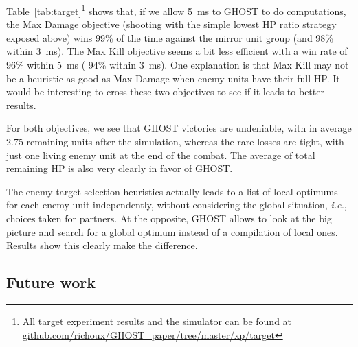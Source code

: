 \documentclass[journal]{IEEEtran}
\newcommand{\minormod}[1]{\color{red} #1\color{black} \xspace}
\newcommand{\ghost}{\textsc{GHOST}\xspace}
\newcommand{\ie}{\textit{i.e.}}
\begin{document}

Table~\ref{tab:target}\footnote{All target experiment results and the simulator can be found at
\href{https://github.com/richoux/GHOST\_paper/tree/master/xp/target}{github.com/richoux/GHOST\_paper/tree/master/xp/target}}
shows that, if we allow 5~ms to \ghost to do computations, the Max Damage objective \minormod{(shooting with the simple lowest HP ratio strategy exposed above)} wins \minormod{99\%} of the time against the
mirror unit group (and \minormod{98\%} within 3~ms).  
The Max Kill objective seems a bit less efficient with a win
rate of \minormod{96\%} within 5~ms (\minormod{94\%} within 3~ms). One explanation is that
Max Kill may not be a heuristic as good as Max Damage when enemy units
have their full HP.  It would be interesting to cross these two
objectives to see if it leads to better results.

For both objectives, we see that \ghost victories are undeniable, with
in average \minormod{2.75} remaining units after the simulation, whereas the rare
losses are tight, with just one living enemy unit at the end of the
combat. The average of total remaining HP is also very clearly in
favor of \ghost.

\minormod{The enemy target selection heuristics actually leads to a list of local optimums for each enemy unit independently, without considering the global situation, \ie, choices taken for partners. At the opposite, \ghost allows to look at the big picture and search for a global optimum instead of a compilation of local ones. Results show this clearly make the difference.}

\subsection{Future work}
\end{document}
